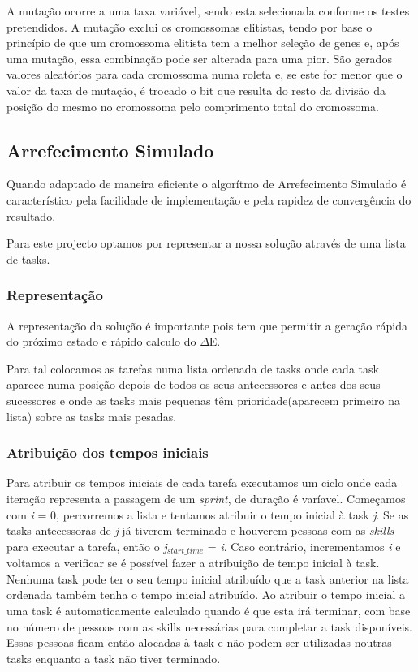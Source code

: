 \begin{titlepage}
A mutação ocorre a uma taxa variável, sendo esta selecionada conforme os testes pretendidos. A mutação exclui os cromossomas elitistas, tendo por base o princípio de que um cromossoma elitista tem a melhor seleção de genes e, após uma mutação, essa combinação pode ser alterada para uma pior. São gerados valores aleatórios para cada cromossoma numa roleta e, se este for menor que o valor da taxa de mutação, é trocado o bit que resulta do resto da divisão da posição do mesmo no cromossoma pelo comprimento total do cromossoma.

\subsection{Arrefecimento Simulado}
\justify\normalsize

Quando adaptado de maneira eficiente o algorítmo de Arrefecimento Simulado é característico pela facilidade de implementação e pela rapidez de convergência do resultado.

Para este projecto optamos por representar a nossa solução através de uma lista de tasks.

\subsubsection{Representação}
A representação da solução é importante pois tem que permitir a geração rápida do próximo estado e rápido calculo do 	$\Delta$E.

Para tal colocamos as tarefas numa lista ordenada de tasks onde cada task aparece numa posição depois de todos os seus antecessores e antes dos seus sucessores e onde as tasks mais pequenas têm prioridade(aparecem primeiro na lista) sobre as tasks mais pesadas.

\subsubsection{Atribuição dos tempos iniciais}
Para atribuir os tempos iniciais de cada tarefa executamos um ciclo onde cada iteração representa a passagem de um \textit{sprint}, de duração é varíavel. Começamos com \textit{i} = 0, percorremos a lista e tentamos atribuir o tempo inicial à task \textit{j}. Se as tasks antecessoras de \textit{j} já tiverem terminado e houverem pessoas com as \textit{skills} para executar a tarefa, então o \textit{j}$_{start\_time}$ = \textit{i}. Caso contrário, incrementamos \textit{i} e voltamos a verificar se é possível fazer a atribuição de tempo inicial à task. Nenhuma task pode ter o seu tempo inicial atribuído que a task anterior na lista ordenada também tenha o tempo inicial atribuído. Ao atribuir o tempo inicial a uma task é automaticamente calculado quando é que esta irá terminar, com base no número de pessoas com as skills necessárias para completar a task disponíveis. Essas pessoas ficam então alocadas à task e não podem ser utilizadas noutras tasks enquanto a task não tiver terminado.


\end{titlepage}
